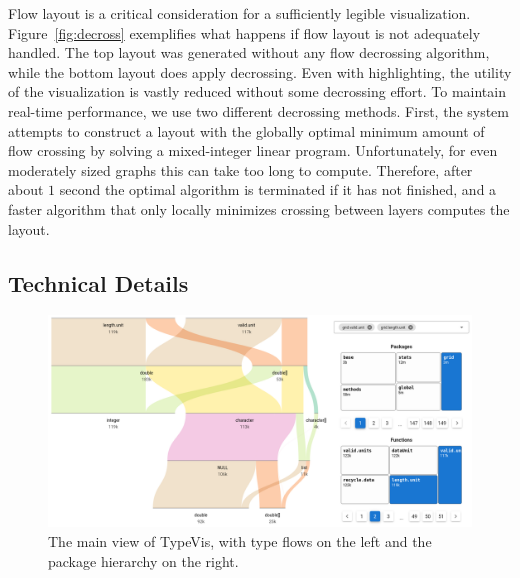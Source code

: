 \documentclass{vgtc}                          %
\begin{document}
Flow layout is a critical consideration
for a sufficiently legible visualization.
Figure~\ref{fig:decross} exemplifies what
happens if flow layout is not adequately handled.
The top layout was generated without any
flow decrossing algorithm,
while the bottom layout does
apply decrossing.
Even with highlighting,
the utility of the visualization is vastly
reduced without some decrossing effort.
To maintain real-time performance,
we use two different decrossing methods.
First, the system attempts to construct
a layout with the globally optimal
minimum amount of flow crossing by
solving a mixed-integer linear program.
Unfortunately, for even moderately
sized graphs this can take too long to compute.
Therefore, after about $1$ second
the optimal algorithm is terminated
if it has not finished, and a faster
algorithm that only locally minimizes crossing
between layers computes the layout.

\subsection{Technical Details}



\begin{figure}
 \centering
 \includegraphics[width=\linewidth]{img/typevis.png}
 \caption{The main view of {\sc TypeVis}, with type flows on the left and the package hierarchy on the right.}
 \label{fig:typevis}
\end{figure}
\end{document}

